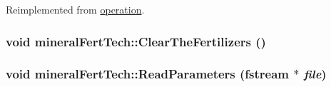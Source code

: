 Reimplemented from \hyperlink{classoperation_a51c5612f29519bc82050ffccf089bc07}{operation}.\hypertarget{classmineral_fert_tech_ad5c4b3218a84dfd14c05eddb9d686d52}{
\subsubsection[{ClearTheFertilizers}]{\setlength{\rightskip}{0pt plus 5cm}void mineralFertTech::ClearTheFertilizers ()}}
\label{classmineral_fert_tech_ad5c4b3218a84dfd14c05eddb9d686d52}
\hypertarget{classmineral_fert_tech_a25acfef0b5b6f2a6463fe9249d13cb9a}{
\subsubsection[{ReadParameters}]{\setlength{\rightskip}{0pt plus 5cm}void mineralFertTech::ReadParameters (fstream $\ast$ {\em file})}}
\label{classmineral_fert_tech_a25acfef0b5b6f2a6463fe9249d13cb9a}


